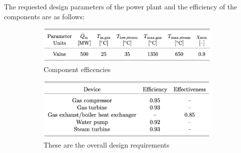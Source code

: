\documentclass{article}
\begin{document}
\FloatBarrier

The requested design parameters of the power plant and the efficiency of the components are as follows:

\begin{figure}[htbp]
  \centering
  \begin{subfigure}[t]{0.45\textwidth}
    \centering
  \includegraphics[page=1,trim=0mm 0mm 0mm 0mm,clip,width=0.99\textwidth]{Figures/png2pdf (1).pdf}
  \caption{Component efficencies}
  \label{fig:epsfig}
\end{subfigure}%
  \begin{subfigure}[t]{0.45\textwidth}
  \centering
  \includegraphics[page=1,trim=0mm 0mm 0mm 0mm,clip,width=0.99\textwidth]{Figures/png2pdf.pdf}
  \caption{These are the overall design requirements}
  \label{fig:pdffig}
  \end{subfigure}%
  \caption{}
  \label{fig:testfig}
\end{figure}
\end{document}
